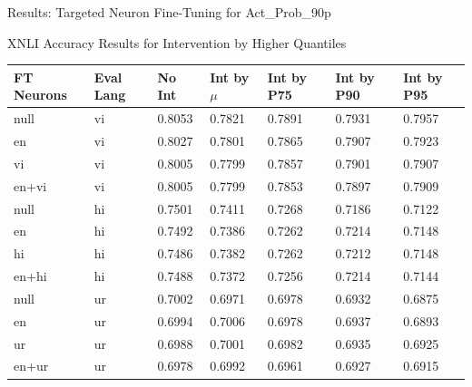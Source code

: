 \documentclass[aspectratio=169]{beamer}
\begin{document}
\begin{frame}{Results: Targeted Neuron Fine-Tuning for Act\_Prob\_90p}
	\begin{block}{\scriptsize XNLI Accuracy Results for Intervention by Higher Quantiles}\scriptsize
		\begin{table}[ht]
			\centering
			\renewcommand{\arraystretch}{1.3}
			\setlength{\tabcolsep}{4pt}
			\begin{tabularx}{\textwidth}{|X|X|X|X|X|X|X|}
				\hline
				\textbf{FT Neurons} & \textbf{Eval Lang} & \textbf{No Int} & \textbf{Int by $\mu$} & \textbf{Int by P75} & \textbf{Int by P90} & \textbf{Int by P95} \\
				\hline
				null & vi & 0.8053 & 0.7821 & 0.7891 & 0.7931 & 0.7957 \\
				en & vi & 0.8027 & 0.7801 & 0.7865 & 0.7907 & 0.7923 \\
				vi & vi & 0.8005 & 0.7799 & 0.7857 & 0.7901 & 0.7907 \\
				en+vi & vi & 0.8005 & 0.7799 & 0.7853 & 0.7897 & 0.7909 \\
				\hline
				null & hi & 0.7501 & 0.7411 & 0.7268 & 0.7186 & 0.7122 \\
				en & hi & 0.7492 & 0.7386 & 0.7262 & 0.7214 & 0.7148 \\
				hi & hi & 0.7486 & 0.7382 & 0.7262 & 0.7212 & 0.7148 \\
				en+hi & hi & 0.7488 & 0.7372 & 0.7256 & 0.7214 & 0.7144 \\
				\hline
				null & ur & 0.7002 & 0.6971 & 0.6978 & 0.6932 & 0.6875 \\
				en & ur & 0.6994 & 0.7006 & 0.6978 & 0.6937 & 0.6893 \\
				ur & ur & 0.6988 & 0.7001 & 0.6982 & 0.6935 & 0.6925 \\
				en+ur & ur & 0.6978 & 0.6992 & 0.6961 & 0.6927 & 0.6915 \\
				\hline
			\end{tabularx}
		\end{table}
	\end{block}
\end{frame}	
	
\end{document}
